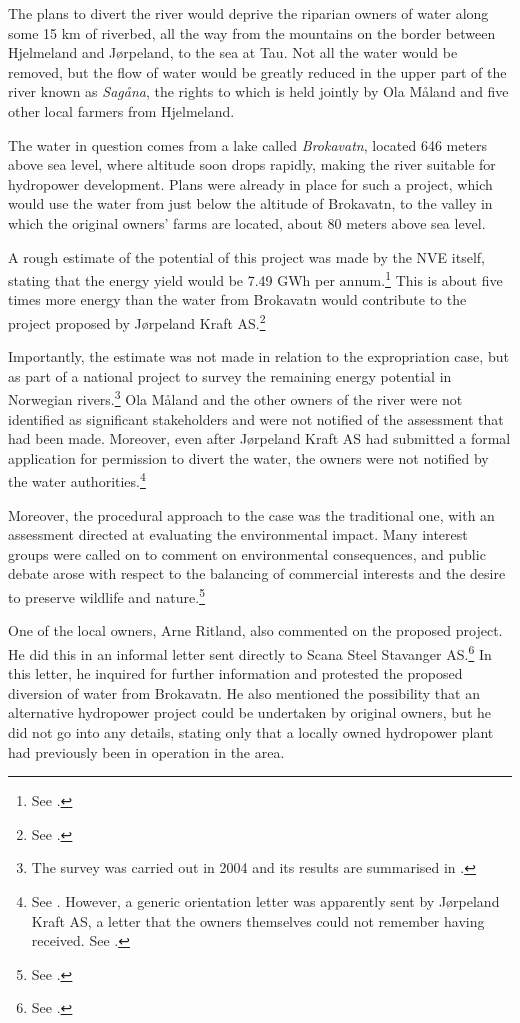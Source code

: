 The plans to divert the river would deprive the riparian owners of water along some 15 km of riverbed, all the way from the mountains on the border between Hjelmeland and Jørpeland, to the sea at Tau. Not all the water would be removed, but the flow of water would be greatly reduced in the upper part of the river known as {\it Sagåna}, the rights to which is held jointly by Ola Måland and five other local farmers from Hjelmeland.

The water in question comes from a lake called \emph{Brokavatn}, located 646 meters above sea level, where altitude soon drops rapidly, making the river suitable for hydropower development. Plans were already in place for such a project, which would use the water from just below the altitude of Brokavatn, to the valley in which the original owners' farms are located, about 80 meters above sea level. 

A rough estimate of the potential of this project was made by the NVE itself, stating that the energy yield would be 7.49 GWh per annum.\footnote{See \cite[16]{jorpeland09}.} This is about five times more energy than the water from Brokavatn would contribute to the project proposed by Jørpeland Kraft AS.\footnote{See \cite[19]{jorpeland09}.}

Importantly, the estimate was not made in relation to the expropriation case, but as part of a national project to survey the remaining energy potential in Norwegian rivers.\footnote{The survey was carried out in 2004 and its results are summarised in \cite{jensen04}.} Ola Måland and the other owners of the river were not identified as significant stakeholders and were not notified of the assessment that had been made. Moreover, even after Jørpeland Kraft AS had submitted a formal application for permission to divert the water, the owners were not notified by the water authorities.\footnote{See \cite[16]{jorpeland09}. However, a generic orientation letter was apparently sent by Jørpeland Kraft AS, a letter that the owners themselves could not remember having received. See \cite[5|8]{jorpeland11a}.}

Moreover, the procedural approach to the case was the traditional one, with an assessment directed at evaluating the environmental impact. Many interest groups were called on to comment on environmental consequences, and public debate arose with respect to the balancing of commercial interests and the desire to preserve wildlife and nature.\footnote{See \cite[19]{jorpeland09}.}

One of the local owners, Arne Ritland, also commented on the proposed project. He did this in an informal letter sent directly to Scana Steel Stavanger AS.\footnote{See \cite[17]{jorpeland09}.} In this letter, he inquired for further information and protested the proposed diversion of water from Brokavatn. He also mentioned the possibility that an alternative hydropower project could be undertaken by original owners, but he did not go into any details, stating only that a locally owned hydropower plant had previously been in operation in the area. 

